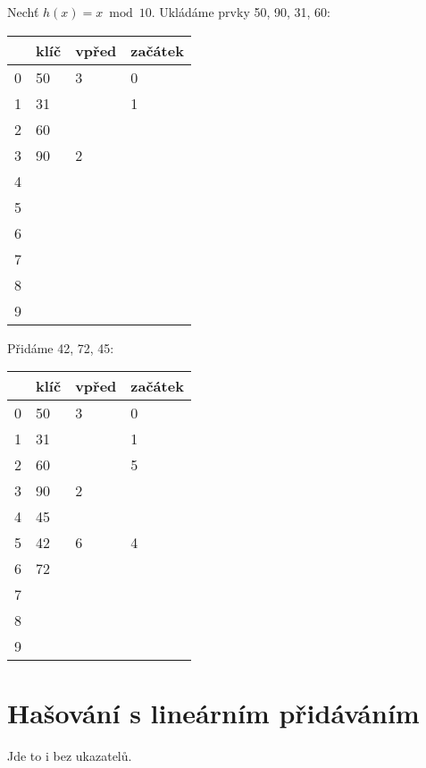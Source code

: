 \begin{priklad}
Nechť $h(x) = x \bmod 10$. Ukládáme prvky 50, 90, 31, 60:

\vspace{5mm}

\begin{tabular}{|l|l|l|l|}
\hline
& klíč& vpřed& začátek\\
\hline
0& 50& 3& 0\\
1& 31& & 1\\
2& 60& & \\
3& 90& 2& \\
4& & & \\
5& & & \\
6& & & \\
7& & & \\
8& & & \\
9& & & \\
\hline
\end{tabular}

\vspace{8mm}

\pagebreak

\begin{samepage}
Přidáme 42, 72, 45:

\vspace{5mm}

\begin{tabular}{|l|l|l|l|}
\hline
& klíč& vpřed& začátek\\
\hline
0& 50& 3& 0\\
1& 31& & 1\\
2& 60& & 5\\
3& 90& 2& \\
4& 45& & \\
5& 42& 6& 4\\
6& 72& & \\
7& & & \\
8& & & \\
9& & & \\
\hline
\end{tabular}
\end{samepage}
\end{priklad}


\section{Hašování s lineárním přidáváním}

Jde to i bez ukazatelů.

